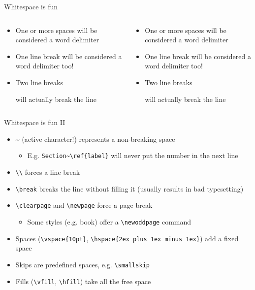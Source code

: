 \documentclass[english]{beamer}
\let\olditem\item
\renewcommand{\item}{\setlength{\itemsep}{\fill}\olditem}
\newenvironment{sitemize}{\let\item\olditem \begin{itemize}}{\vfill\end{itemize}}
\begin{document}
\begin{frame}[fragile]{Whitespace is fun}
\begin{columns}
    \begin{column}{0.5\textwidth}
\begin{itemize}
\item One or more   spaces 
will be considered 
a word delimiter
\item One line break 
will be considered 
a word delimiter too!
\item Two line breaks 

will actually break the line
\end{itemize}
    \end{column}
    \begin{column}{0.5\textwidth}
    \begin{verbatim*}
\begin{itemize}
\item One or more   spaces 
will be considered 
a word delimiter
\item One line break 
will be considered 
a word delimiter too!
\item Two line breaks 

will actually break the line
\end{itemize}
    \end{verbatim*}
    \end{column}
\end{columns}
\end{frame}

\begin{frame}[fragile]{Whitespace is fun II}
    \begin{itemize}
        \item \textasciitilde{} (active character!) represents a non-breaking space
        \begin{sitemize}
            \item E.g. \verb|Section~\ref{label}| will never put the number in the next line
        \end{sitemize} 
        \item \verb|\\| forces a line break
        \item \verb|\break| breaks the line without filling it (usually results in bad typesetting)
        \item \verb|\clearpage| and \verb|\newpage| force a page break
        \begin{sitemize}
            \item Some styles (e.g. book) offer a \verb|\newoddpage| command
        \end{sitemize} 
        \item Spaces (\verb|\vspace{10pt}|, \verb|\hspace{2ex plus 1ex minus 1ex}|) add a fixed space
        \item Skips are predefined spaces, e.g. \verb|\smallskip|
        \item Fills (\verb|\vfill|, \verb|\hfill|) take all the free space
    \end{itemize}
\end{frame}
\end{document}
